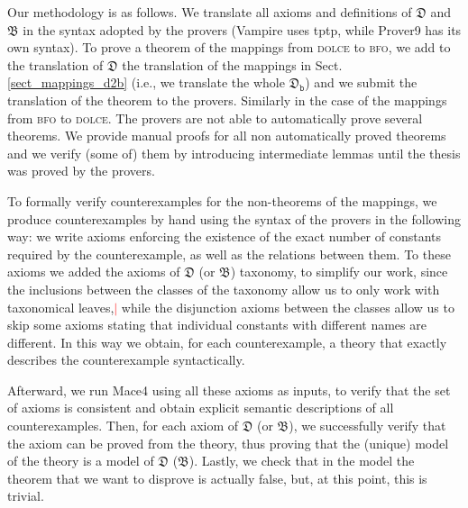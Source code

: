 \documentclass[ao]{iosart2x}
\newcommand{\nb}[1]{\textcolor{red}{$|$}\marginpar{\hspace*{-0cm}\parbox{20mm}{\scriptsize\raggedright\textcolor{red}{#1}}}}
\newcommand{\dolce}{{\textsc{dolce}}}
\newcommand{\bfo}{{\textsc{bfo}}}
\newcommand {\thdolce} {\ensuremath{\mathfrak{D}}}
\newcommand {\thbfo} {\ensuremath{\mathfrak{B}}}
\newcommand {\thdolcedbmap} {\ensuremath{\mathfrak{D}_\texttt{b}}}
\begin{document}
Our methodology is as follows. We translate all axioms and definitions of {$\thdolce$} and $\thbfo$ in the  syntax adopted by the provers (Vampire uses tptp, while Prover9 has its own syntax).
To prove a theorem of the mappings from {\dolce} to {\bfo}, we add to the translation of $\thdolce$ the translation of the mappings in Sect.\ref{sect_mappings_d2b} (i.e., we translate the whole $\thdolcedbmap$) and we submit the translation of the theorem to the provers. Similarly in the case of the mappings from {\bfo} to {\dolce}.
The provers are not able to automatically prove several theorems. We provide manual proofs for all  non automatically proved theorems and we verify (some of) them by introducing intermediate lemmas until the thesis was proved by the provers. %

To formally verify counterexamples for the non-theorems of the mappings, we produce counterexamples by hand using the syntax of the provers in the following way: we write axioms enforcing the existence of the exact number of constants required by the counterexample, as well as the relations between them. To these axioms we added the axioms of {$\thdolce$} (or  {$\thbfo$}) taxonomy, to simplify our work, since the inclusions between the classes of the taxonomy allow us to only work with taxonomical leaves,\nb{CM: leggera modifica} %
while the disjunction axioms between the classes allow us to skip some axioms stating that individual constants with different names are different. In this way we obtain, for each counterexample, a theory that exactly describes the counterexample syntactically.

Afterward, we run Mace4 using all these axioms as inputs, to verify that the set of axioms is consistent and obtain explicit semantic descriptions of all counterexamples. Then, for each axiom of {$\thdolce$} (or $\thbfo$), we successfully verify that the axiom can be proved from the theory, thus proving that the (unique) model of the theory is a model of {$\thdolce$} ($\thbfo$). 
Lastly, we check that in the model the theorem that we want to disprove is actually false, but, at this point, this is trivial.
\end{document}
